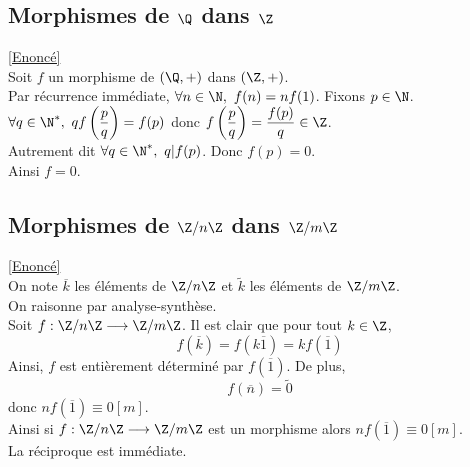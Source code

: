 \documentclass[8pt]{book}
\begin{document}
	\subsection{Morphismes de $\Q$ dans $\Z$ }
	\label{Morphismes de Q dans Z corrigé}
	\textcolor{blue}{\hyperref[Morphismes de Q dans Z]{[Enoncé]}}\\
	Soit $f$ un morphisme de $(\Q,+)$ dans $(\Z,+)$.\\
	Par récurrence immédiate, $\forall n\in \N,\ f(n)=nf(1)$. Fixons $p\in \N$.\\
	$\forall q\in \N^*,\ qf\left(\displaystyle\frac{p}{q}\right)=f(p)$ donc $f\left(\displaystyle\frac{p}{q}\right)=\displaystyle\frac{f(p)}{q}\in \Z$.\\
	Autrement dit $\forall q\in \N^*,\ q|f(p)$. Donc $f(p)=0$.\\
	Ainsi $f=0$.
	
	\subsection{Morphismes de $\Z/n\Z$ dans $\Z/m\Z$ }
	\label{Morphismes de Z/nZ dans Z/mZ corrigé}
	\textcolor{blue}{\hyperref[Morphismes de Z/nZ dans Z/mZ]{[Enoncé]}}\\
	On note $\overline{k}$ les éléments de $\Z/n\Z$ et $\tilde k$ les éléments de $\Z/m\Z$.\\
	On raisonne par analyse-synthèse.\\
	Soit $f : \Z/n\Z \longrightarrow \Z/m\Z$. 
	Il est clair que pour tout $k\in \Z$, \[f(\overline{k})=f(k\overline{1})=kf(\overline{1})\]
	Ainsi, $f$ est entièrement déterminé par $f(\overline{1})$.
	De plus, \[f(\overline{n})=\tilde0\] donc $nf(\overline{1})\equiv 0 [m]$.\\
	Ainsi si $f: \Z/n\Z \longrightarrow \Z/m\Z$ est un morphisme alors $nf(\overline{1})\equiv 0[m]$.\\
	La réciproque est immédiate.
	
\end{document}
